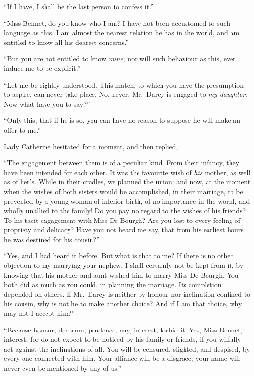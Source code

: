 “If I have, I shall be the last person to confess it.”

“Miss Bennet, do you know who I am? I have not
been accustomed to such language as this. I am almost
the nearest relation he has in the world, and am entitled
to know all his dearest concerns.”

“But you are not entitled to know \textit{mine}; nor will
such behaviour as this, ever induce me to be explicit.”

“Let me be rightly understood. This match, to which
you have the presumption to aspire, can never take place.
No, never. Mr.\ Darcy is engaged to \textit{my daughter}. Now
what have you to say?”

“Only this; that if he is so, you can have no reason
to suppose he will make an offer to me.”

Lady Catherine hesitated for a moment, and then
replied,

“The engagement between them is of a peculiar kind.
From their infancy, they have been intended for each
other. It was the favourite wish of \textit{his} mother, as well
as of her’s. While in their cradles, we planned the union:
and now, at the moment when the wishes of both sisters
would be accomplished, in their marriage, to be prevented
by a young woman of inferior birth, of no importance in
the world, and wholly unallied to the family! Do you
pay no regard to the wishes of his friends? To his tacit
engagement with Miss De Bourgh? Are you lost to every
feeling of propriety and delicacy? Have you not heard
me say, that from his earliest hours he was destined for
his cousin?”

“Yes, and I had heard it before. But what is that
to me? If there is no other objection to my marrying your
nephew, I shall certainly not be kept from it, by knowing
that his mother and aunt wished him to marry Miss
De Bourgh. You both did as much as you could, in planning
the marriage. Its completion depended on others.
If Mr.\ Darcy is neither by honour nor inclination confined
to his cousin, why is not he to make another choice? And
if I am that choice, why may not I accept him?”

“Because honour, decorum, prudence, nay, interest,
forbid it. Yes, Miss Bennet, interest; for do not expect
to be noticed by his family or friends, if you wilfully act
against the inclinations of all. You will be censured,
slighted, and despised, by every one connected with him.
Your alliance will be a disgrace; your name will never
even be mentioned by any of us.”

